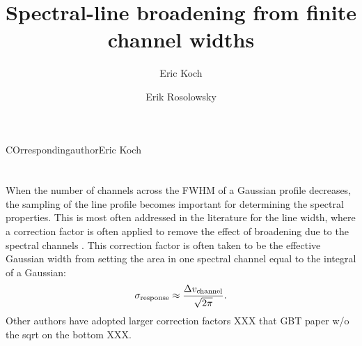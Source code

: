 \documentclass{rnaastex}
\begin{document}
\title{Spectral-line broadening from finite channel widths}

COrrespondingauthor{Eric Koch}
\author[0000-0001-9605-780X]{Eric Koch}
\author[0000-0002-5204-2259]{Erik Rosolowsky}


\keywords{}


\section{}

When the number of channels across the FWHM of a Gaussian profile decreases, the sampling of the line profile becomes important for determining the spectral properties.  This is most often addressed in the literature for the line width, where a correction factor is often applied to remove the effect of broadening due to the spectral channels \citep[e.g.,][]{cprops2006PASP..118..590R}. This correction factor is often taken to be the effective Gaussian width from setting the area in one spectral channel equal to the integral of a Gaussian:
\begin{equation}
    \label{eq:width_corr_fact}
    \sigma_{\rm response} \approx \frac{\Delta v_{\rm channel}}{\sqrt{2\pi}}.
\end{equation}
Other authors have adopted larger correction factors XXX that GBT paper w/o the sqrt on the bottom XXX.
\end{document}
